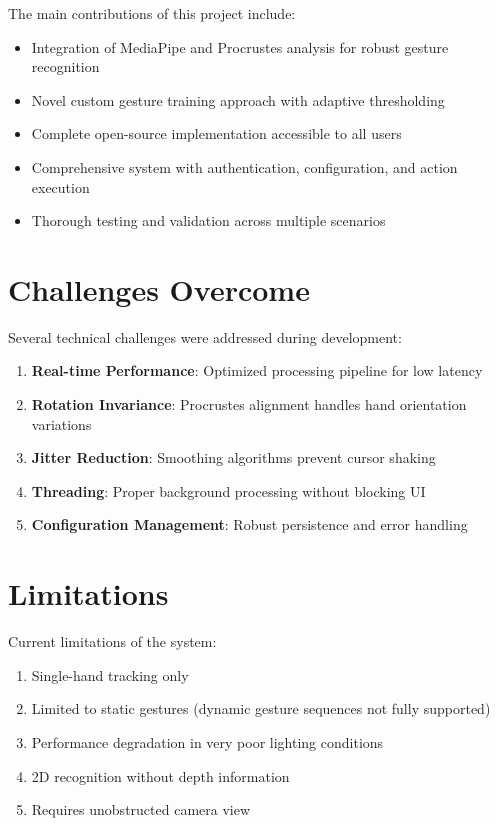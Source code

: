 \documentclass[12pt,a4paper]{report}
\begin{document}
The main contributions of this project include:

\begin{itemize}
    \item Integration of MediaPipe and Procrustes analysis for robust gesture recognition
    \item Novel custom gesture training approach with adaptive thresholding
    \item Complete open-source implementation accessible to all users
    \item Comprehensive system with authentication, configuration, and action execution
    \item Thorough testing and validation across multiple scenarios
\end{itemize}

\section{Challenges Overcome}

Several technical challenges were addressed during development:

\begin{enumerate}
    \item \textbf{Real-time Performance}: Optimized processing pipeline for low latency
    \item \textbf{Rotation Invariance}: Procrustes alignment handles hand orientation variations
    \item \textbf{Jitter Reduction}: Smoothing algorithms prevent cursor shaking
    \item \textbf{Threading}: Proper background processing without blocking UI
    \item \textbf{Configuration Management}: Robust persistence and error handling
\end{enumerate}

\section{Limitations}

Current limitations of the system:

\begin{enumerate}
    \item Single-hand tracking only
    \item Limited to static gestures (dynamic gesture sequences not fully supported)
    \item Performance degradation in very poor lighting conditions
    \item 2D recognition without depth information
    \item Requires unobstructed camera view
\end{enumerate}
\end{document}
